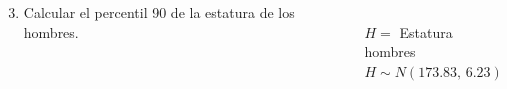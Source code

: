 \documentclass[aspectratio=149,10pt,xcolor=dvipsnames,t]{beamer}
\begin{document}
\begin{frame}
\begin{columns}
\begin{column}[T]{0.6\textwidth}
\begin{enumerate}
\setcounter{enumi}{2}
\item Calcular el percentil 90 de la estatura de los hombres. 
\end{enumerate}
\end{column}
\begin{column}[T]{0.4\textwidth}
\\
$H=$ Estatura hombres\\
$H\sim N(173.83,\,6.23)$
\end{column}
\end{columns}
\end{frame}
\end{document}
